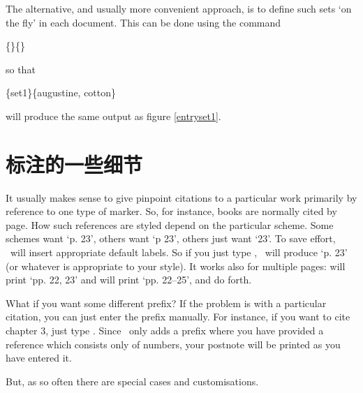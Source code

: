 The alternative, and usually more convenient approach, is to define
such sets `on the fly' in each document. This can be done using the
command
\begin{pseudoverb}
  \centering{}\{\}\{\}
\end{pseudoverb}
so that
\begin{pseudoverb}
  \centering
{}\{set1\}\{augustine, cotton\}
\end{pseudoverb}
will produce the same output as figure \ref{entryset1}.

\section{标注的一些细节}

It usually makes sense to give pinpoint citations to a particular work
primarily by reference to one type of marker. 
So, for instance, books
are normally cited by page. How such references are styled depend on
the particular scheme. Some schemes want `p. 23', others want `p 23',
others just want `23'. To save effort, \biblatex\ will insert
appropriate default labels. So if you just type ,
\biblatex\ will produce `p. 23' (or whatever is appropriate to your
style). It works also for multiple pages: 
will print `pp. 22, 23' and  will print
`pp. 22--25', and do forth.


What if you want some different prefix? If the problem is with a
particular citation, you can just enter the prefix manually. For
instance, if you want to cite chapter 3, just type
. Since \biblatex\ only adds a
prefix where you have provided a reference which consists only of
numbers, your postnote will be printed as you have entered it.

 But, as so often there are special
cases and customisations.

